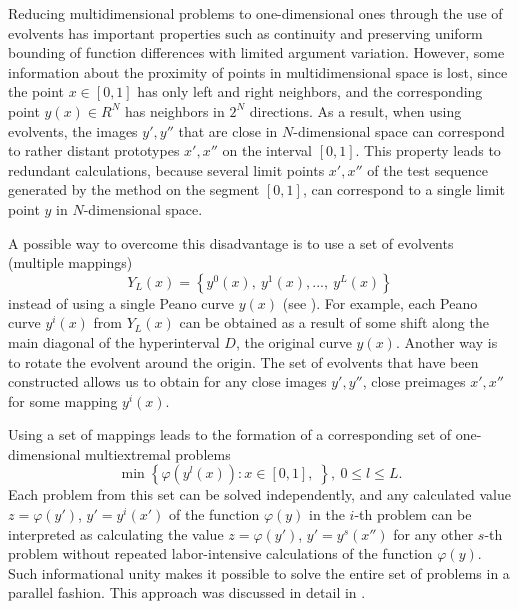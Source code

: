 \documentclass{svproc}
\begin{document}
Reducing multidimensional problems to one-dimensional ones through the use of evolvents has important properties such as continuity and preserving uniform bounding of function differences with limited argument variation. However, some information about the proximity of points in multidimensional space is lost, since the point \(x\in [0,1]\) has only left and right neighbors, and the corresponding point \(y(x) \in R^N\) has neighbors in \(2^N\) directions. As a result, when using evolvents, the images \(y' , y''\) that are close in \(N\)-dimensional space can correspond to rather distant prototypes \(x' , x''\) on the interval \([0,1]\). This property leads to redundant calculations, because several limit points \(x' , x''\) of the test sequence generated by the method on the segment \([0,1]\), can correspond to a single limit point \(y\) in \(N\)-dimensional space.

A possible way to overcome this disadvantage is to use a set of evolvents (multiple mappings)
\begin{displaymath}
\label{eq:142}
Y_L(x)=\left\{y^0(x),\ y^1(x),...,\ y^L(x)\right\}
\end{displaymath}
instead of using a single Peano curve \(y(x)\) (see \cite{Strongin1992,Strongin2000}). For example, each Peano curve \(y^i(x)\) from \(Y_L(x)\) can be obtained as a result of some shift along the main diagonal of the hyperinterval \(D\), the original curve \(y(x)\). Another way is to rotate the evolvent around the origin. The set of evolvents that have been constructed allows us to obtain for any close images \(y', y''\), close preimages \(x', x''\) for some mapping \(y^i(x)\).

Using a set of mappings leads to the formation of a corresponding set of one-dimensional multiextremal problems
\begin{displaymath}
\label{6_problem_l}
\min{\left\{\varphi(y^l(x)):x\in [0,1], \;  \right\}}, \ 0 \leqslant l \leqslant L.
\end{displaymath}
Each problem from this set can be solved independently, and any calculated value \(z= \varphi(y')\), \(y'=y^i(x')\) of the function \(\varphi(y)\) in the \(i\)-th problem can be interpreted as calculating the value \(z= \varphi(y')\), \(y'=y^s(x'')\) for any other \(s\)-th problem without repeated labor-intensive calculations of the function \(\varphi(y)\). Such informational unity makes it possible to solve the entire set of problems in a parallel fashion. This approach was discussed in detail in \cite{Barkalov2019}.
\end{document}
